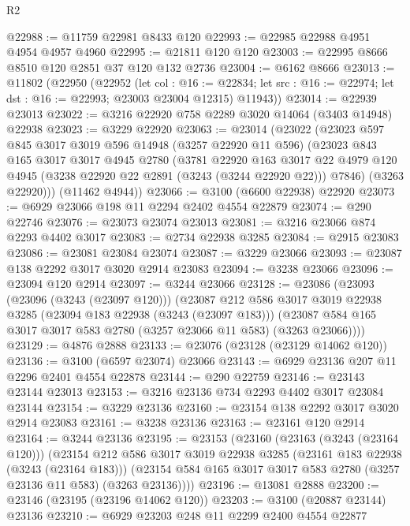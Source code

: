 \begin{lexlean}{R2}
\begin{coremodule}
@22988 := @11759 @22981 @8433 @120
@22993 := @22985 @22988 @4951 @4954 @4957 @4960
@22995 := @21811 @120 @120
@23003 := @22995 @8666 @8510 @120 @2851 @37 @120 @132 @2736
@23004 := @6162 @8666
@23013 := @11802
    (@22950
      (@22952
        (let col : @16 := @22834;
        let src : @16 := @22974; let dst : @16 := @22993; @23003 @23004 @12315)
        @11943))
@23014 := @22939 @23013
@23022 := @3216 @22920 @758 @2289 @3020 @14064 (@3403 @14948) @22938
@23023 := @3229 @22920
@23063 := @23014
    (@23022
      (@23023
        @597
        @845
        @3017
        @3019
        @596
        @14948
        (@3257 @22920 @11 @596)
        (@23023
          @843
          @165
          @3017
          @3017
          @4945
          @2780
          (@3781
            @22920
            @163
            @3017
            @22
            @4979
            @120
            @4945
            (@3238 @22920 @22 @2891 (@3243 (@3244 @22920 @22)))
            @7846)
          (@3263 @22920)))
      (@11462 @4944))
@23066 := @3100 (@6600 @22938) @22920
@23073 := @6929 @23066 @198 @11 @2294 @2402 @4554 @22879
@23074 := @290 @22746
@23076 := @23073 @23074 @23013
@23081 := @3216 @23066 @874 @2293 @4402 @3017
@23083 := @2734 @22938 @3285
@23084 := @2915 @23083
@23086 := @23081 @23084 @23074
@23087 := @3229 @23066
@23093 := @23087 @138 @2292 @3017 @3020 @2914 @23083
@23094 := @3238 @23066
@23096 := @23094 @120 @2914
@23097 := @3244 @23066
@23128 := @23086
    (@23093
      (@23096 (@3243 (@23097 @120)))
      (@23087
        @212
        @586
        @3017
        @3019
        @22938
        @3285
        (@23094 @183 @22938 (@3243 (@23097 @183)))
        (@23087 @584 @165 @3017 @3017 @583 @2780 (@3257 @23066 @11 @583) (@3263 @23066))))
@23129 := @4876 @2888
@23133 := @23076 (@23128 (@23129 @14062 @120))
@23136 := @3100 (@6597 @23074) @23066
@23143 := @6929 @23136 @207 @11 @2296 @2401 @4554 @22878
@23144 := @290 @22759
@23146 := @23143 @23144 @23013
@23153 := @3216 @23136 @734 @2293 @4402 @3017 @23084 @23144
@23154 := @3229 @23136
@23160 := @23154 @138 @2292 @3017 @3020 @2914 @23083
@23161 := @3238 @23136
@23163 := @23161 @120 @2914
@23164 := @3244 @23136
@23195 := @23153
    (@23160
      (@23163 (@3243 (@23164 @120)))
      (@23154
        @212
        @586
        @3017
        @3019
        @22938
        @3285
        (@23161 @183 @22938 (@3243 (@23164 @183)))
        (@23154 @584 @165 @3017 @3017 @583 @2780 (@3257 @23136 @11 @583) (@3263 @23136))))
@23196 := @13081 @2888
@23200 := @23146 (@23195 (@23196 @14062 @120))
@23203 := @3100 (@20887 @23144) @23136
@23210 := @6929 @23203 @248 @11 @2299 @2400 @4554 @22877

\end{coremodule}
\end{lexlean}
